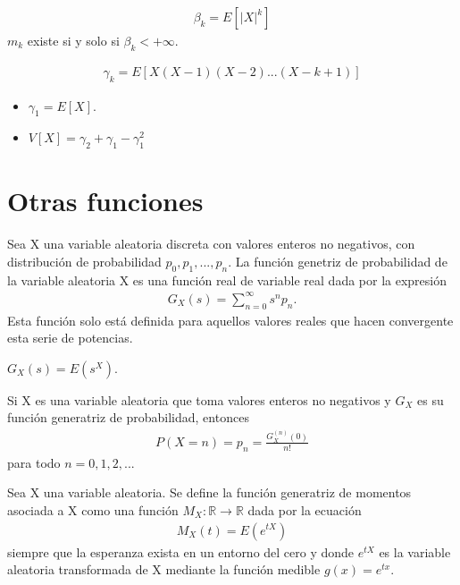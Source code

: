 \begin{defi}
\begin{align*}
    \beta_k = E[|X|^k]
\end{align*}
$m_k$ existe si y solo si $\beta_k < +\infty$.
\end{defi}

\begin{defi}
\begin{align*}
    \gamma_k = E[X(X - 1)(X - 2)...(X - k + 1)]
\end{align*}
\begin{itemize}
    \item $\gamma_1 = E[X]$.
    \item $V[X] = \gamma_2 + \gamma_1 - \gamma_1^2$
\end{itemize}
\end{defi}

\section{Otras funciones}

\begin{defi}
Sea X una variable aleatoria discreta con valores enteros no negativos, con distribución de probabilidad $p_0, p_1,...,p_n$. La función genetriz de probabilidad de la variable aleatoria X es una función real de variable real dada por la expresión
\begin{align*}
    G_X(s) = \sum_{n=0}^{\infty}{s^np_n}.
\end{align*}
Esta función solo está definida para aquellos valores reales que hacen convergente esta serie de potencias.
\end{defi}

\begin{obs}
$G_X(s) = E(s^X)$.
\end{obs}

\begin{teo}
Si X es una variable aleatoria que toma valores enteros no negativos y $G_X$ es su función generatriz de probabilidad, entonces
\begin{align*}
    P(X = n) = p_n = \frac{G_X^{(n)}(0)}{n!} 
\end{align*}
para todo $n= 0, 1, 2,...$
\end{teo}

\begin{defi}
Sea X una variable aleatoria. Se define la función generatriz de momentos asociada a X como una función $M_X: \mathbb{R} \longrightarrow \mathbb{R}$ dada por la ecuación
\begin{align*}
    M_X(t) = E(e^{tX})
\end{align*}
siempre que la esperanza exista en un entorno del cero y donde $e^{tX}$ es la variable aleatoria transformada de X mediante la función medible $g(x) = e^{tx}$.
\end{defi}

